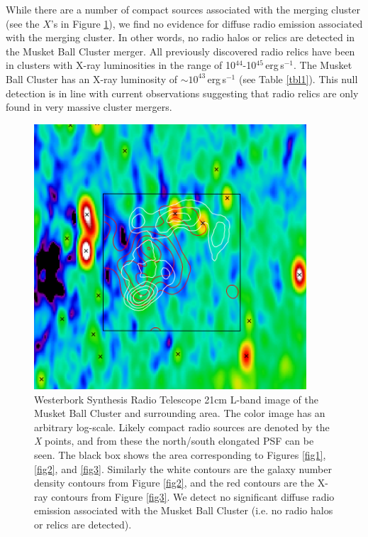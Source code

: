 While there are a number of compact sources associated with the merging cluster (see the $X$'s in Figure \ref{figure:MusketBallRadio}), we find no evidence for diffuse radio emission associated with the merging cluster.
In other words, no radio halos or relics are detected in the Musket Ball Cluster merger.
All previously discovered radio relics have been in clusters with X-ray luminosities in the range of 10$^{44}$-10$^{45}$\,erg\,s$^{-1}$.
The Musket Ball Cluster has an X-ray luminosity of $\sim 10^{43}$\,erg\,s$^{-1}$ (see Table \ref{tbl1}). 
This null detection is in line with current observations suggesting that radio relics are only found in very massive cluster mergers.

\begin{figure}
\centering
\includegraphics[width=4in]{Chapter2/RadioWithGalaxyAndXrayContours.png}
\caption[Radio survey of the Musket Ball Cluster and surrounding area.]{
Westerbork Synthesis Radio Telescope 21cm L-band image of the Musket Ball Cluster and surrounding area.  The color image has an arbitrary log-scale.  Likely compact radio sources are denoted by the \emph{X} points, and from these the north/south elongated PSF can be seen.  The black box shows the area corresponding to Figures \ref{fig1}, \ref{fig2}, and \ref{fig3}. Similarly the white contours are the galaxy number density contours from Figure \ref{fig2}, and the red contours are the X-ray contours from Figure \ref{fig3}.  We detect no significant diffuse radio emission associated with the Musket Ball Cluster (i.e. no radio halos or relics are detected).
\label{figure:MusketBallRadio}}
\end{figure}

